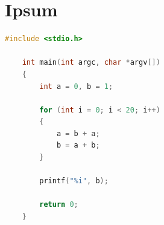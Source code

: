 \lipsum[2]

\section{Ipsum}

\begin{lstlisting}[language=c]
    #include <stdio.h>

    int main(int argc, char *argv[])
    {
        int a = 0, b = 1;
        
        for (int i = 0; i < 20; i++)
        {
            a = b + a;
            b = a + b;
        }

        printf("%i", b);

        return 0;
    }
\end{lstlisting}

\lipsum[2-4]